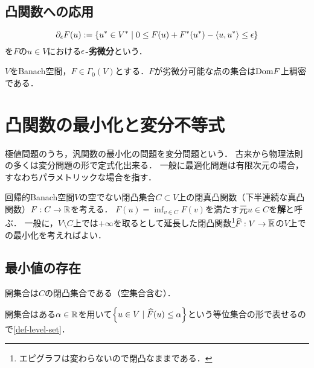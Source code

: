 \documentclass[uplatex,dvipdfmx]{jsreport}
\begin{document}
\subsection{凸関数への応用}

\begin{definition}
    \[\partial_\epsilon F(u):=\left\{u^*\in V^*\mid 0\le F(u)+F^*(u^*)-\langle u,u^*\rangle\le\epsilon\right\}\]
    を$F$の$u\in V$における\textbf{$\epsilon$-劣微分}という．
\end{definition}

\begin{theorem}
    
\end{theorem}

\begin{corollary}\label{cor-subdifferentiable-points-of-Banach-operator}
    $V$をBanach空間，$F\in\Gamma_0(V)$とする．$F$が劣微分可能な点の集合は$\mathrm{Dom} F$上稠密である．
\end{corollary}

\section{凸関数の最小化と変分不等式}

\begin{tcolorbox}[colframe=ForestGreen, colback=ForestGreen!10!white,breakable,colbacktitle=ForestGreen!40!white,coltitle=black,fonttitle=\bfseries\sffamily,
title=]
    極値問題のうち，汎関数の最小化の問題を変分問題という．
    古来から物理法則の多くは変分問題の形で定式化出来る．
    一般に最適化問題は有限次元の場合，すなわちパラメトリックな場合を指す．
\end{tcolorbox}

\begin{problem}
    回帰的Banach空間$V$の空でない閉凸集合$C\subset V$上の閉真凸関数（下半連続な真凸関数）$F:C\to\mathbb{R}$を考える．
    $F(u)=\inf_{v\in C}F(v)$を満たす元$u\in C$を\textbf{解}と呼ぶ．
    一般に，$V\setminus C$上では$+\infty$を取るとして延長した閉凸関数\footnote{エピグラフは変わらないので閉凸なままである．}$\widehat{F}:V\to\overline{\mathbb{R}}$の$V$上での最小化を考えればよい．
\end{problem}

\subsection{最小値の存在}

\begin{proposition}
    開集合は$C$の閉凸集合である（空集合含む）．
\end{proposition}
\begin{Proof}
    開集合はある$\alpha\in\mathbb{R}$を用いて$\left\{u\in V\mid\widehat{F}(u)\le\alpha\right\}$という等位集合の形で表せるので\ref{def-level-set}．
\end{Proof}
\end{document}
